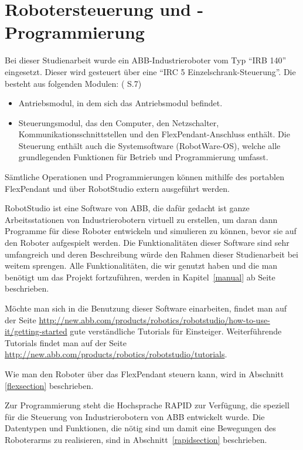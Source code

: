 
\chapter{Robotersteuerung und -Programmierung}
Bei dieser Studienarbeit wurde ein ABB-Industrieroboter vom Typ \enquote{IRB 140} eingesetzt. Dieser wird gesteuert über eine \enquote{IRC 5 Einzelschrank-Steuerung}. Die besteht aus folgenden Modulen: (\cite{irc5} S.7)

\begin{itemize}
\item Antriebsmodul, in dem sich das Antriebsmodul befindet.

\item Steuerungsmodul, das den Computer, den Netzschalter, Kommunikationsschnittstellen und den FlexPendant-Anschluss enthält. Die Steuerung enthält auch die Systemsoftware (RobotWare-OS), welche alle grundlegenden Funktionen für Betrieb und Programmierung umfasst.
\end{itemize}

Sämtliche Operationen und Programmierungen können mithilfe des portablen FlexPendant und über RobotStudio extern ausgeführt werden. 

RobotStudio ist eine Software von ABB, die dafür gedacht ist ganze Arbeitsstationen von Industrierobotern virtuell zu erstellen, um daran dann Programme für diese Roboter entwickeln und simulieren zu können, bevor sie auf den Roboter aufgespielt werden. Die Funktionalitäten dieser Software sind sehr umfangreich und deren Beschreibung würde den Rahmen dieser Studienarbeit bei weitem sprengen. Alle Funktionalitäten, die wir genutzt haben und die man benötigt um das Projekt fortzuführen, werden in Kapitel~\ref{manual} ab Seite~\pageref{manual} beschrieben. 

Möchte man sich in die Benutzung dieser Software einarbeiten, findet man auf der Seite \href{http://new.abb.com/products/robotics/robotstudio/how-to-use-it/getting-started}{http://new.abb.com/products/robotics/robotstudio/how-to-use-it/getting-started} gute verständliche Tutorials für Einsteiger. Weiterführende Tutorials findet man auf der Seite \href{http://new.abb.com/products/robotics/robotstudio/tutorials}{http://new.abb.com/products/robotics/robotstudio/tutorials}.

Wie man den Roboter über das FlexPendant steuern kann, wird in Abschnitt \ref{flexsection} beschrieben.

Zur Programmierung steht die Hochsprache RAPID zur Verfügung, die speziell für die Steuerung von Industrierobotern von ABB entwickelt wurde. Die Datentypen und Funktionen, die nötig sind um damit eine Bewegungen des Roboterarms zu realisieren, sind in Abschnitt~\ref{rapidsection} beschrieben.

